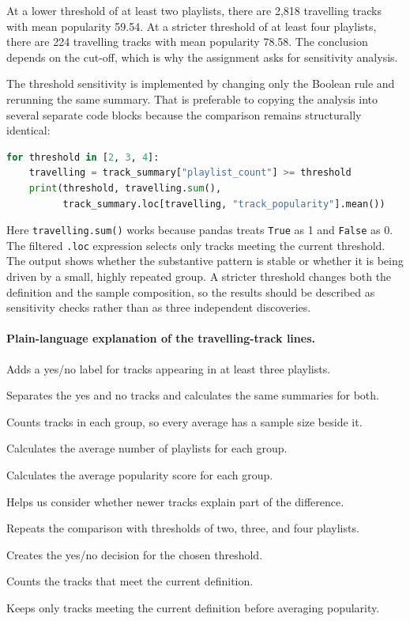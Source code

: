 \documentclass[11pt,a4paper]{article}
\begin{document}
At a lower threshold of at least two playlists, there are 2,818 travelling tracks with mean popularity 59.54. At a stricter threshold of at least four playlists, there are 224 travelling tracks with mean popularity 78.58. The conclusion depends on the cut-off, which is why the assignment asks for sensitivity analysis.

The threshold sensitivity is implemented by changing only the Boolean rule and rerunning the same summary. That is preferable to copying the analysis into several separate code blocks because the comparison remains structurally identical:

\begin{lstlisting}[language=python]
for threshold in [2, 3, 4]:
    travelling = track_summary["playlist_count"] >= threshold
    print(threshold, travelling.sum(),
          track_summary.loc[travelling, "track_popularity"].mean())
\end{lstlisting}

Here \texttt{travelling.sum()} works because pandas treats \texttt{True} as 1 and \texttt{False} as 0. The filtered \texttt{.loc} expression selects only tracks meeting the current threshold. The output shows whether the substantive pattern is stable or whether it is being driven by a small, highly repeated group. A stricter threshold changes both the definition and the sample composition, so the results should be described as sensitivity checks rather than as three independent discoveries.

\paragraph{Plain-language explanation of the travelling-track lines.}
\begin{description}[leftmargin=3.2cm,style=multiline]
    \item[Mark travelling tracks] Adds a yes/no label for tracks appearing in at least three playlists.
    \item[Make two groups] Separates the yes and no tracks and calculates the same summaries for both.
    \item[Count tracks] Counts tracks in each group, so every average has a sample size beside it.
    \item[Average playlist count] Calculates the average number of playlists for each group.
    \item[Average popularity] Calculates the average popularity score for each group.
    \item[Average release year] Helps us consider whether newer tracks explain part of the difference.
    \item[Test three thresholds] Repeats the comparison with thresholds of two, three, and four playlists.
    \item[Make the current rule] Creates the yes/no decision for the chosen threshold.
    \item[Count yes values] Counts the tracks that meet the current definition.
    \item[Select matching tracks] Keeps only tracks meeting the current definition before averaging popularity.
\end{description}
\end{document}

